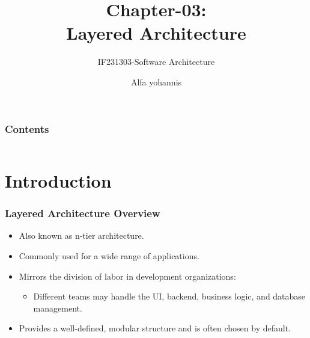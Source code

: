 \documentclass[aspectratio=169, table]{beamer}
\title{\LARGE{Chapter-03:}\\ \Huge{Layered Architecture} \vspace{20pt}}
\subtitle{IF231303-Software Architecture}
\author{Alfa yohannis}
\begin{document}
	\begin{frame}[plain]
		\maketitle
	\end{frame}

	\begin{frame}[fragile]
		\frametitle{Contents}
		
		\begin{columns}[t]
			\tableofcontents[sections={1-5}]
			
			\tableofcontents[sections={6-7}]
		\end{columns}
	\end{frame}
	
	\section{Introduction}
	
	\begin{frame}
		\frametitle{Layered Architecture Overview}
		\begin{itemize}
			\item Also known as n-tier architecture.
			\item Commonly used for a wide range of applications.
			\item Mirrors the division of labor in development organizations:
			\begin{itemize}
				\item Different teams may handle the UI, backend, business logic, and database management.
			\end{itemize}
			\item Provides a well-defined, modular structure and is often chosen by default.
		\end{itemize}
	\end{frame}
	
\end{document}
